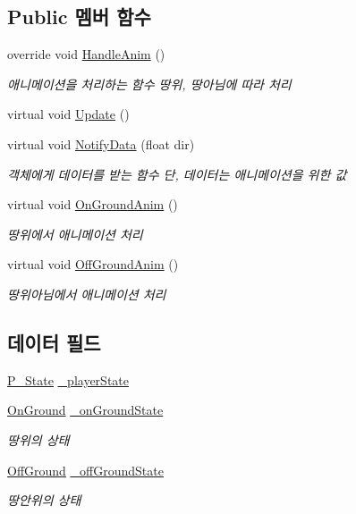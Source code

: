 \subsection*{Public 멤버 함수}
\begin{DoxyCompactItemize}
\item 
override void \mbox{\hyperlink{class_player_state_ae57c0c11c946d701bb1e0eb2bc7204dd}{Handle\+Anim}} ()
\begin{DoxyCompactList}\small\item\em 애니메이션을 처리하는 함수\textquotesingle{} 땅위, 땅아님에 따라 처리 \end{DoxyCompactList}\item 
virtual void \mbox{\hyperlink{class_state_ad3ecac701a93b8ef7e5365e0fc599243}{Update}} ()
\item 
virtual void \mbox{\hyperlink{class_state_a7c2adea0228ec1582cd5bda7b36d245e}{Notify\+Data}} (float dir)
\begin{DoxyCompactList}\small\item\em 객체에게 데이터를 받는 함수 단, 데이터는 애니메이션을 위한 값 \end{DoxyCompactList}\item 
virtual void \mbox{\hyperlink{class_state_adc5e7be4e977f0a64b29b01171eda8af}{On\+Ground\+Anim}} ()
\begin{DoxyCompactList}\small\item\em 땅위에서 애니메이션 처리 \end{DoxyCompactList}\item 
virtual void \mbox{\hyperlink{class_state_a2909a234430fa7752fadf2bb993ab5e2}{Off\+Ground\+Anim}} ()
\begin{DoxyCompactList}\small\item\em 땅위아님에서 애니메이션 처리 \end{DoxyCompactList}\end{DoxyCompactItemize}
\subsection*{데이터 필드}
\begin{DoxyCompactItemize}
\item 
\mbox{\hyperlink{class_player_state_afe68f1a1529955d173ccd309da55001b}{P\+\_\+\+State}} \mbox{\hyperlink{class_player_state_a9492a14c13c0dc523c37cb44d334ab68}{\+\_\+player\+State}}
\item 
\mbox{\hyperlink{class_state_ab9eb1c1d81f1903b8486d1275e78b68e}{On\+Ground}} \mbox{\hyperlink{class_state_ab3170df5e58f541f39edff3c1278d443}{\+\_\+on\+Ground\+State}}
\begin{DoxyCompactList}\small\item\em 땅위의 상태 \end{DoxyCompactList}\item 
\mbox{\hyperlink{class_state_a7d945e793324c017a973205564cf1a56}{Off\+Ground}} \mbox{\hyperlink{class_state_ad421039bfc35b46969f174c9617ab786}{\+\_\+off\+Ground\+State}}
\begin{DoxyCompactList}\small\item\em 땅안위의 상태 \end{DoxyCompactList}\end{DoxyCompactItemize}
